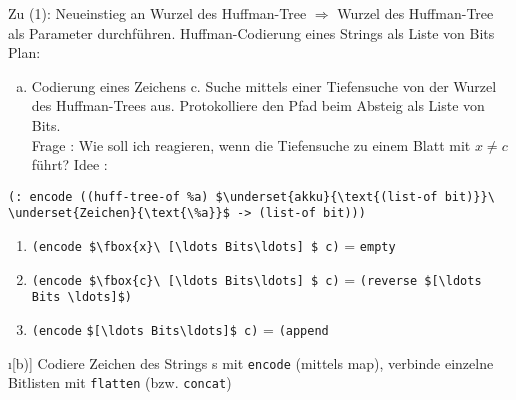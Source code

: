 Zu (1): Neueinstieg an Wurzel des Huffman-Tree $\Rightarrow$ Wurzel des Huffman-Tree als Parameter durchführen.
Huffman-Codierung eines Strings als Liste von Bits\\
Plan:
\begin{enumerate}[a)]
\item
Codierung eines Zeichens c. Suche mittels einer Tiefensuche von der Wurzel des Huffman-Trees aus. Protokolliere den Pfad beim Absteig als Liste von Bits.\\
Frage : Wie soll ich reagieren, wenn die Tiefensuche zu einem Blatt mit $x \ne c$ führt?
Idee : \end{enumerate}
\lstinline[mathescape]|(: encode ((huff-tree-of %a) $\underset{akku}{\text{(list-of bit)}}\ \underset{Zeichen}{\text{\%a}}$ -> (list-of bit)))|
\begin{enumerate}[(1)]
\item \lstinline[mathescape]|(encode $\fbox{x}\ [\ldots Bits\ldots] $ c)| = \lstinline|empty|
\item \lstinline[mathescape]|(encode $\fbox{c}\ [\ldots Bits\ldots] $ c)| = \lstinline[mathescape]|(reverse $[\ldots Bits \ldots]$)|
\item \lstinline[mathescape]|(encode|  \lstinline[mathescape]|$[\ldots Bits\ldots]$ c)| = \lstinline[mathescape]|(append|
\end{enumerate}
\begin{enumerate}
\i[b)] Codiere Zeichen des Strings s mit \lstinline|encode| (mittels map), verbinde einzelne Bitlisten mit \lstinline|flatten| (bzw. \lstinline|concat|)
\end{enumerate}
